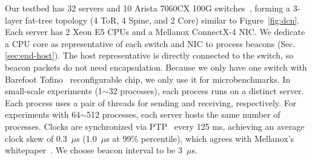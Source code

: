 Our testbed has 32 servers and 10 Arista 7060CX 100G switches~\cite{arista}, forming a 3-layer fat-tree topology (4 ToR, 4 Spine, and 2 Core) similar to Figure~\ref{fig:dcn}.
Each server has 2 Xeon E5 CPUs and a Mellanox ConnectX-4 NIC. %
We dedicate a CPU core as representative of each switch and NIC to process beacons (Sec.\ref{sec:end-host}). The host representative is directly connected to the switch, so beacon packets do not need encapsulation.
Because we only have one switch with Barefoot Tofino~\cite{tofino} reconfigurable chip, we only use it for microbenchmarks.
In small-scale experiments (1$\sim$32 processes), each process runs on a distinct server. Each process uses a pair of threads for sending and receiving, respectively.
For experiments with 64$\sim$512 processes, each server hosts the same number of processes.
Clocks are synchronized via PTP~\cite{correll2005design} every 125 ms, achieving an average clock skew of 0.3~$\mu$s (1.0~$\mu$s at 99\% percentile), which agrees with Mellanox's whitepaper~\cite{mellanox-ptp}.
We choose beacon interval to be 3~$\mu$s.


\iffalse
\begin{table}[t]
\centering
{}
\caption{Network topologies for evaluation.}
\label{tab:eval-topology}
\end{table}

